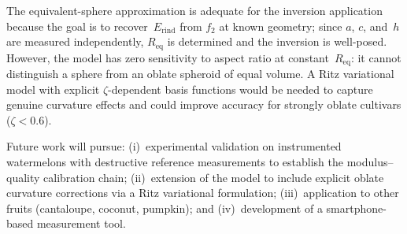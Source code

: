 The equivalent-sphere approximation is adequate for the inversion
application because the goal is to recover~$E_{\mathrm{rind}}$ from
$f_2$ at known geometry; since $a$, $c$, and~$h$ are measured
independently, $R_{\mathrm{eq}}$ is determined and the inversion is
well-posed.  However, the model has zero sensitivity to aspect ratio at
constant~$R_{\mathrm{eq}}$: it cannot distinguish a sphere from an
oblate spheroid of equal volume.  A Ritz variational model with explicit
$\zeta$-dependent basis functions would be needed to capture genuine
curvature effects and could improve accuracy for strongly oblate
cultivars ($\zeta < 0.6$).

Future work will pursue: (i)~experimental validation on instrumented
watermelons with destructive reference measurements to establish the
modulus--quality calibration chain; (ii)~extension of the model to
include explicit oblate curvature corrections via a Ritz variational
formulation; (iii)~application to other fruits (cantaloupe, coconut,
pumpkin); and (iv)~development of a smartphone-based measurement tool.
